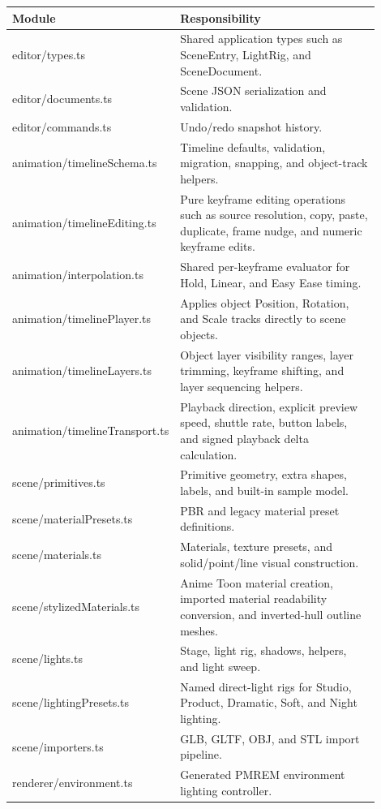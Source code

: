 \documentclass[12pt,a4paper]{article}
\begin{document}
\begin{table}[h]
\centering
\begin{tabular}{>{\ttfamily}p{0.34\linewidth}p{0.56\linewidth}}
\toprule
Module & Responsibility \\
\midrule
editor/types.ts & Shared application types such as SceneEntry, LightRig, and SceneDocument. \\
editor/documents.ts & Scene JSON serialization and validation. \\
editor/commands.ts & Undo/redo snapshot history. \\
animation/timelineSchema.ts & Timeline defaults, validation, migration, snapping, and object-track helpers. \\
animation/timelineEditing.ts & Pure keyframe editing operations such as source resolution, copy, paste, duplicate, frame nudge, and numeric keyframe edits. \\
animation/interpolation.ts & Shared per-keyframe evaluator for Hold, Linear, and Easy Ease timing. \\
animation/timelinePlayer.ts & Applies object Position, Rotation, and Scale tracks directly to scene objects. \\
animation/timelineLayers.ts & Object layer visibility ranges, layer trimming, keyframe shifting, and layer sequencing helpers. \\
animation/timelineTransport.ts & Playback direction, explicit preview speed, shuttle rate, button labels, and signed playback delta calculation. \\
scene/primitives.ts & Primitive geometry, extra shapes, labels, and built-in sample model. \\
scene/materialPresets.ts & PBR and legacy material preset definitions. \\
scene/materials.ts & Materials, texture presets, and solid/point/line visual construction. \\
scene/stylizedMaterials.ts & Anime Toon material creation, imported material readability conversion, and inverted-hull outline meshes. \\
scene/lights.ts & Stage, light rig, shadows, helpers, and light sweep. \\
scene/lightingPresets.ts & Named direct-light rigs for Studio, Product, Dramatic, Soft, and Night lighting. \\
scene/importers.ts & GLB, GLTF, OBJ, and STL import pipeline. \\
renderer/environment.ts & Generated PMREM environment lighting controller. \\

\end{tabular}
\end{table}
\end{document}
